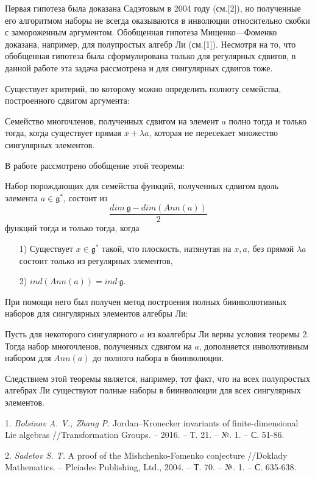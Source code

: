      Первая гипотеза была доказана Садэтовым в 2004 году (см.[2]), но полученные его алгоритмом наборы не всегда оказываются в инволюции относительно скобки с замороженным аргументом.
Обобщенная гипотеза Мищенко---Фоменко доказана, например, для полупростых алгебр Ли (см.[1]). Несмотря на то, что обобщенная гипотеза была сформулирована только для регулярных сдвигов, в данной работе эта задача рассмотрена и для сингулярных сдвигов тоже.


Существует критерий, по которому можно определить полноту семейства, построенного сдвигом аргумента:
\begin{theorem}
Семейство многочленов, полученных сдвигом на элемент $a$ полно тогда и только тогда, когда существует прямая $x+\lambda a$, которая не пересекает множество сингулярных элементов.
\end{theorem}
В работе рассмотрено обобщение этой теоремы:
\begin{theorem}
Набор порождающих для семейства функций, полученных сдвигом вдоль элемента $a\in \mathfrak{g}^*$, состоит из
$$\frac{dim \  \mathfrak{g}- dim (Ann(a))} 2$$
функций тогда и только тогда, когда
\begin{itemize}
    \item [1)] Существует $x\in \mathfrak{g}^*$ такой, что плоскость, натянутая на $x,a$, без прямой $\lambda a$ состоит только из регулярных элементов,
    \item[2)] $ind(Ann(a))=ind \  \mathfrak{g}$.
\end{itemize}
\end{theorem}
При помощи него был получен метод построения полных биинволютивных наборов для сингулярных элементов алгебры Ли:
\begin{theorem}
Пусть для некоторого сингулярного $a$ из коалгебры Ли верны условия теоремы 2.
Тогда набор многочленов, полученных сдвигом на $a$,  дополняется инволютивным набором для $Ann(a)$ до полного набора в биинволюции.
\end{theorem}
Следствием этой теоремы является, например, тот факт, что на всех полупростых алгебрах Ли существуют полные наборы в биинволюции для всех сингулярных элементов.
\litlist

1. {\it Bolsinov A. V., Zhang P.} Jordan–Kronecker invariants of finite-dimensional Lie algebras //Transformation Groups. – 2016. – Т. 21. – №. 1. – С. 51-86.

2. {\it Sadetov S. T.} A proof of the Mishchenko-Fomenko conjecture //Doklady Mathematics. – Pleiades Publishing, Ltd., 2004. – Т. 70. – №. 1. – С. 635-638.
